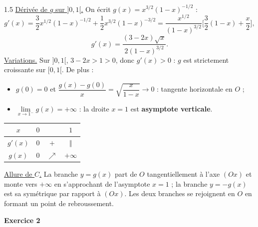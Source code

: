 \documentclass[12pt]{article}
\begin{document}
\begin{spacing}{1.5}
\underline{Dérivée de $g$ sur $]0,1[$.} On écrit $g(x)=x^{3/2}(1-x)^{-1/2}$ :
\[
g'(x)=\frac32x^{1/2}(1-x)^{-1/2}+\frac12x^{3/2}(1-x)^{-3/2}=\frac{x^{1/2}}{(1-x)^{3/2}}\Big[\frac32(1-x)+\frac x2\Big],
\]
\[
\boxed{g'(x)=\frac{(3-2x)\sqrt x}{2(1-x)^{3/2}}}.
\]
\underline{Variations.} Sur $]0,1[$, $3-2x>1>0$, donc $g'(x)>0$ : $g$ est strictement croissante sur $[0,1[$. De plus :
\begin{itemize}
\item $g(0)=0$ et $\dfrac{g(x)-g(0)}{x}=\sqrt{\dfrac{x}{1-x}}\to0$ : tangente horizontale en $O$ ;
\item $\lim\limits_{x\to1^-}g(x)=+\infty$ : la droite $x=1$ est \textbf{asymptote verticale}.
\end{itemize}
\begin{center}
\begin{tabular}{c|ccc}
$x$ & $0$ & & $1$\\
\hline
$g'(x)$ & $0$ & $+$ & $\Vert$\\
\hline
$g(x)$ & $0$ & $\nearrow$ & $+\infty$
\end{tabular}
\end{center}
\underline{Allure de $C$.} La branche $y=g(x)$ part de $O$ tangentiellement à l'axe $(Ox)$ et monte vers $+\infty$ en s'approchant de l'asymptote $x=1$ ; la branche $y=-g(x)$ est sa symétrique par rapport à $(Ox)$. Les deux branches se rejoignent en $O$ en formant un point de rebroussement.

\begin{center}
\end{center}

\medskip\textbf{Exercice 2}



\end{spacing}
\end{document}
